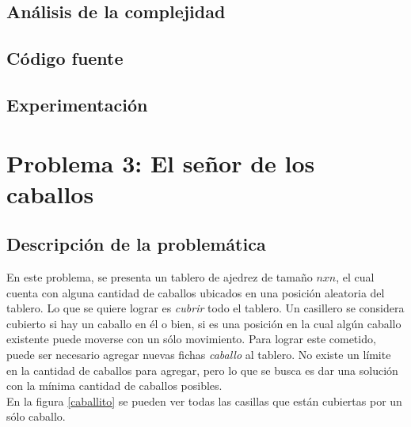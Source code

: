 \documentclass[a4paper]{article}
\begin{document}
\subsection{An\'alisis de la complejidad}
\subsection{C\'odigo fuente}
\subsection{Experimentaci\'on}



\newpage

\section{Problema 3: El se\~nor de los caballos}
\subsection{Descripci\'on de la problem\'atica}

En este problema, se presenta un tablero de ajedrez de tama\~no $nxn$, el cual cuenta con alguna cantidad de caballos ubicados en una posici\'on aleatoria del tablero. Lo que se quiere lograr es \emph{cubrir} todo el tablero. Un casillero se considera cubierto si hay un caballo en \'el o bien, si es una posici\'on en la cual alg\'un caballo existente puede moverse con un s\'olo movimiento. Para lograr este cometido, puede ser necesario agregar nuevas fichas \emph{caballo} al tablero. No existe un l\'imite en la cantidad de caballos para agregar, pero lo que se busca es dar una soluci\'on con la m\'inima cantidad de caballos posibles.\\


En la figura \ref{caballito} se pueden ver todas las casillas que est\'an cubiertas por un s\'olo caballo.
\end{document}
